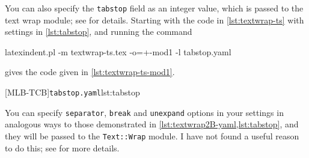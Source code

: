  You can also specify the \texttt{tabstop} field  as an integer value, which is passed to the text wrap module; see
 \cite{textwrap} for details. Starting with the code in \cref{lst:textwrap-ts} with
 settings in \cref{lst:tabstop}, and running the command 
 \begin{commandshell}
	 latexindent.pl -m textwrap-ts.tex -o=+-mod1 -l tabstop.yaml
	 \end{commandshell}
 gives the code given in \cref{lst:textwrap-ts-mod1}.
 \begin{cmhtcbraster}[raster columns=3,
   raster left skip=-3.5cm,
   raster right skip=-2cm,
   raster column skip=.03\linewidth]
  [MLB-TCB]{\texttt{tabstop.yaml}}{lst:tabstop}
 \end{cmhtcbraster}

 You can specify \texttt{separator}, \texttt{break} and \texttt{unexpand} options in your
 settings in analogous ways to those demonstrated in
 \cref{lst:textwrap2B-yaml,lst:tabstop}, and they will be passed to the
 \texttt{Text::Wrap} module. I have not found a useful reason to do this; see
 \cite{textwrap} for more details.
